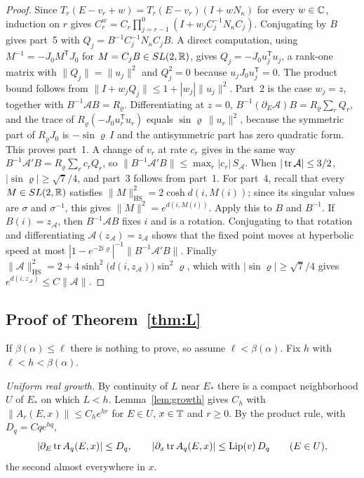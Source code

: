 \begin{proof}
Since $T_r(E-v_r+w)=T_r(E-v_r)(I+wN_\kappa)$ for every $w\in\mathbb C$, induction on $r$ gives $C^w_r=C_r\prod_{j=r-1}^{0}(I+w_jC_j^{-1}N_\kappa C_j)$. Conjugating by $B$ gives part~5 with $Q_j=B^{-1}C_j^{-1}N_\kappa C_jB$. A direct computation, using $M^{-1}=-J_0M^{\mathsf T}J_0$ for $M=C_jB\in SL(2,\mathbb R)$, gives $Q_j=-J_0u_j^{\mathsf T}u_j$, a rank-one matrix with $\|Q_j\|=\|u_j\|^2$ and $Q_j^2=0$ because $u_jJ_0u_j^{\mathsf T}=0$. The product bound follows from $\|I+w_jQ_j\|\le1+|w_j|\|u_j\|^2$. Part~2 is the case $w_j=z$, together with $B^{-1}\mathcal AB=R_\varrho$. Differentiating at $z=0$, $B^{-1}(\partial_E\mathcal A)B=R_\varrho\sum_rQ_r$, and the trace of $R_\varrho(-J_0u_r^{\mathsf T}u_r)$ equals $\sin\varrho\,\|u_r\|^2$, because the symmetric part of $R_\varrho J_0$ is $-\sin\varrho\,I$ and the antisymmetric part has zero quadratic form. This proves part~1. A change of $v_r$ at rate $c_r$ gives in the same way $B^{-1}\mathcal A'B=R_\varrho\sum_rc_rQ_r$, so $\|B^{-1}\mathcal A'B\|\le\max_r|c_r|\,S_{\mathcal A}$. When $|\operatorname{tr}\mathcal A|\le3/2$, $|\sin\varrho|\ge\sqrt7/4$, and part~3 follows from part~1. For part~4, recall that every $M\in SL(2,\mathbb R)$ satisfies $\|M\|_{\mathrm{HS}}^2=2\cosh d(i,M(i))$; since its singular values are $\sigma$ and $\sigma^{-1}$, this gives $\|M\|^2=e^{d(i,M(i))}$. Apply this to $B$ and $B^{-1}$. If $B(i)=z_{\mathcal A}$, then $B^{-1}\mathcal AB$ fixes $i$ and is a rotation. Conjugating to that rotation and differentiating $\mathcal A(z_{\mathcal A})=z_{\mathcal A}$ shows that the fixed point moves at hyperbolic speed at most $|1-e^{-2i\varrho}|^{-1}\|B^{-1}\mathcal A'B\|$. Finally $\|\mathcal A\|_{\mathrm{HS}}^2=2+4\sinh^2\bigl(d(i,z_{\mathcal A})\bigr)\sin^2\varrho$, which with $|\sin\varrho|\ge\sqrt7/4$ gives $e^{d(i,z_{\mathcal A})}\le C\|\mathcal A\|$.
\end{proof}

\subsection{Proof of Theorem~\ref{thm:L}}

If $\beta(\alpha)\le\ell$ there is nothing to prove, so assume $\ell<\beta(\alpha)$. Fix $h$ with $\ell<h<\beta(\alpha)$.

\emph{Uniform real growth.} By continuity of $L$ near $E_*$ there is a compact neighborhood $U$ of $E_*$ on which $L<h$. Lemma~\ref{lem:growth} gives $C_h$ with $\|A_r(E,x)\|\le C_he^{hr}$ for $E\in U$, $x\in\mathbb T$ and $r\ge0$. By the product rule, with $D_q=Cqe^{hq}$,
\begin{equation}\label{eq:Dq}
|\partial_E\operatorname{tr} A_q(E,x)|\le D_q,\qquad|\partial_x\operatorname{tr} A_q(E,x)|\le\operatorname{Lip}(v)\,D_q\qquad(E\in U),
\end{equation}
the second almost everywhere in $x$.


